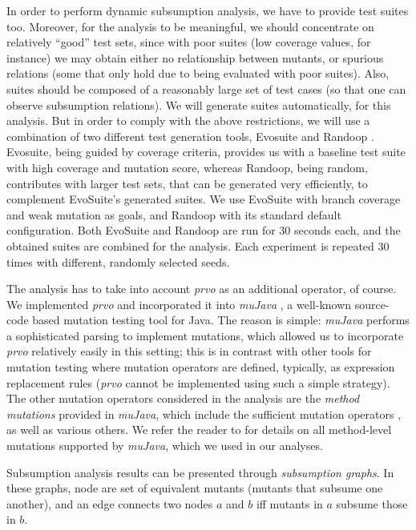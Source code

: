 In order to perform dynamic subsumption analysis, we have to provide test suites too. Moreover, for the analysis to be meaningful, we should concentrate on relatively ``good'' test sets, since with poor suites (low coverage values, for instance) we may obtain either no relationship between mutants, or spurious relations (some that only hold due to being evaluated with poor suites). Also, suites should be composed of a reasonably large set of test cases (so that one can observe subsumption relations). We will generate suites automatically, for this analysis. But in order to comply with the above restrictions, we will use a combination of two different test generation tools, Evosuite \cite{evosuite} and Randoop \cite{randoop}. Evosuite, being guided by coverage criteria, provides us with a baseline test suite with high coverage and mutation score, whereas Randoop, being random, contributes with larger test sets, that can be generated very efficiently, to complement EvoSuite's generated suites. We use EvoSuite with branch coverage and weak mutation as goals, and Randoop with its standard default configuration. Both EvoSuite and Randoop are run for 30 seconds each, and the obtained suites are combined for the analysis. Each experiment is repeated 30 times with different, randomly selected seeds. 


The analysis has to take into account \emph{prvo} as an additional operator, of course. We implemented \emph{prvo} and incorporated it into \emph{muJava} \cite{mujava}, a well-known source-code based mutation testing tool for Java. The reason is simple: \emph{muJava} performs a sophisticated parsing to implement mutations, which allowed us to incorporate \emph{prvo} relatively easily in this setting; this is in contrast with other tools for mutation testing where mutation operators are defined, typically, as expression replacement rules (\emph{prvo} cannot be implemented using such a simple strategy). The other mutation operators considered in the analysis are the \emph{method mutations} provided in \emph{muJava}, which include the sufficient mutation operators \cite{sufficient-mut-ops}, as well as various others. We refer the reader to \cite{muJavaMOPS} for details on all method-level mutations supported by \emph{muJava}, which we used in our analyses.  

Subsumption analysis results can be presented through \emph{subsumption graphs}. In these graphs, node are set of equivalent mutants (mutants that subsume one another), and an edge connects two nodes $a$ and $b$ iff mutants in $a$ subsume those in $b$. 

